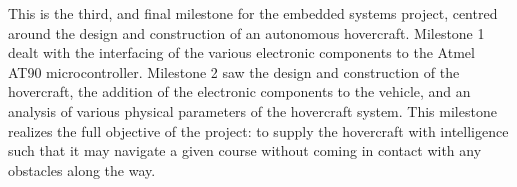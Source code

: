 This is the third, and final milestone for the embedded systems project, centred around the design and construction of an autonomous hovercraft.  Milestone 1 dealt with the interfacing of the various electronic components to the Atmel AT90 microcontroller.  Milestone 2 saw the design and construction of the hovercraft, the addition of the electronic components to the vehicle, and an analysis of various physical parameters of the hovercraft system.  This milestone realizes the full objective of the project: to supply the hovercraft with intelligence such that it may navigate a given course without coming in contact with any obstacles along the way.  
